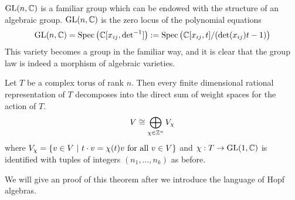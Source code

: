 \documentclass[12pt]{article}
\begin{document}
\begin{example}
    $\operatorname{GL}(n,\mathbb{C})$ is a familiar group which can be endowed with the structure of an algebraic group.
    $\operatorname{GL}(n,\mathbb{C})$ is the zero locus of the polynomial equations
    \begin{align*}
        \operatorname{GL}(n,\mathbb{C}) = \operatorname{Spec} \big(\mathbb{C}[x_{ij},{\det}^{-1}]\big) := \operatorname{Spec}\big(\mathbb{C}[x_{ij},t]/(\det(x_{ij})t-1)\big)
    \end{align*} This variety becomes a group in the familiar way,
    and it is clear that the group law is indeed a morphism of algebraic varieties.
\end{example}




\begin{theorem}\label{thm:ratrep}
    Let $T$ be a complex torus of rank $n$.
    Then every finite dimensional rational representation of $T$ 
    decomposes into the direct sum of weight spaces for the action of $T$.
    \begin{align*}
        V \cong \bigoplus_{\chi\in \mathbb{Z}^n} V_\chi
    \end{align*} where $V_\chi = \{v\in V \ \vert \  t\cdot v = \chi(t)v \text{ for all $v\in V$}\}$
    and $\chi:T\to\operatorname{GL}(1,\mathbb{C})$ is identified with tuples of integers $(n_1,\ldots, n_k)$ as before.
\end{theorem}
We will give an proof of this theorem after we introduce the language of Hopf algebras.
\end{document}
